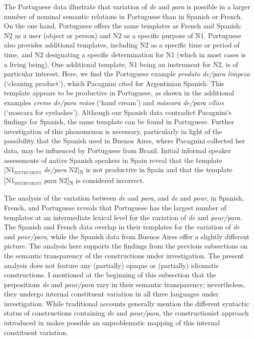 \documentclass[output=paper]{langsci/langscibook}
\begin{document}
The Portuguese data illustrate that variation of \textit{de} and \textit{para} is possible in a larger number of nominal semantic relations in Portuguese than in Spanish or French. On the one hand, Portuguese offers the same templates as French and Spanish: N2 as a user (object or person) and N2 as a specific purpose of N1. Portuguese also provides additional templates, including N2 as a specific time or period of time, and N2 designating a specific determination for N1 (which in most cases is a living being). One additional template, N1 being an instrument for N2, is of particular interest. Here, we find the Portuguese example \textit{produto de/para limpeza} (`cleaning product'), which Pacagnini cited for Argentinian Spanish. This template appears to be productive in Portuguese, as shown in the additional examples \textit{creme de/para mãos} (`hand cream') and \textit{máscara de\slash para cílios} (`mascara for eyelashes'). Although our Spanish data contradict Pacagnini's findings for Spanish, the same template can be found in Portuguese. Further investigation of this phenomenon is necessary, particularly in light of the possibility that the Spanish used in Buenos Aires, where Pacagnini collected her data, may be influenced by Portuguese from Brazil. Initial informal speaker assessments of native Spanish speakers in Spain reveal that the template [N1\textsubscript{\scshape instrument} \textit{de/para} N2]\textsubscript{N} is not productive in Spain and that the template [N1\textsubscript{\scshape instrument} \textit{para} N2]\textsubscript{N} is considered incorrect. 

The analysis of the variation between \textit{de} and \textit{para}, and \textit{de} and \textit{pour}, in Spanish, French, and Portuguese reveals that Portuguese has the largest number of templates at an intermediate lexical level for the variation of \textit{de} and \textit{pour/para}. The Spanish and French data overlap in their templates for the variation of \textit{de} and \textit{pour/para}, while the Spanish data from Buenos Aires \citep{Pacagnini:2003} offer a slightly different picture. The analysis here supports the findings from the previous subsections on the semantic transparency of the constructions under investigation. The present analysis does not feature any (partially) opaque or (partially) idiomatic constructions.
I mentioned at the beginning of this subsection that the prepositions \textit{de} and \textit{pour/para} vary in their semantic transparency; nevertheless, they undergo internal constituent variation in all three languages under investigation. While traditional accounts generally mention the different syntactic status of constructions containing \textit{de} and \textit{pour/para}, the constructionist approach introduced in  makes possible an unproblematic mapping of this internal constituent variation.  
\end{document}
